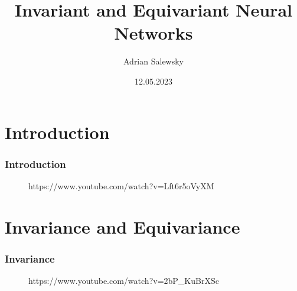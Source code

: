 \documentclass{beamer}
\title{Invariant and Equivariant Neural Networks}
\author[Adrian Salewsky]{Adrian Salewsky}
\institute{Technische Universität Berlin}
\date{12.05.2023}
\begin{document}
\frame{\titlepage}


\section{Introduction} 
\begin{frame}
\frametitle{Introduction}
\begin{figure}[h]
\caption{https://www.youtube.com/watch?v=Lft6r5oVyXM}
\end{figure}
\end{frame}

\section{Invariance and Equivariance}
\begin{frame}
\frametitle{Invariance}
\begin{figure}[h]
\caption{https://www.youtube.com/watch?v=2bP\_KuBrXSc}
\end{figure}
\end{frame}
\end{document}
